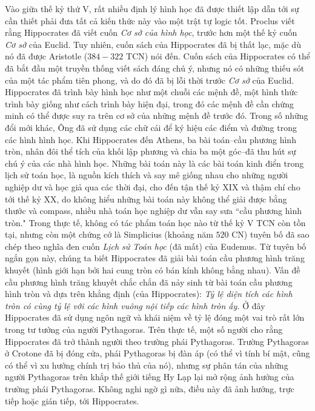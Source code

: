 \begin{multicols}{2}
	\vskip 0.1cm
	Vào giữa thế kỷ thứ V, rất nhiều định lý hình học đã được thiết lập dẫn tới sự cần thiết phải đưa tất cả kiến thức này vào một trật tự logic tốt. Proclus viết rằng Hippocrates đã viết cuốn  \textit{Cơ sở của hình học}, trước hơn một thế kỷ cuốn \textit{Cơ sở}  của Euclid. Tuy nhiên, cuốn sách của Hippocrates đã bị thất lạc, mặc dù nó đã được Aristotle ($384-322$ TCN) nói đến. Cuốn sách của Hippocrates có thể đã bắt đầu một truyền thống viết sách đáng chú ý, nhưng nó có những thiếu sót của một tác phẩm tiên phong, và do đó đã bị lỗi thời trước \textit{Cơ sở} của Euclid.
	\vskip 0.1cm
	Hippocrates đã trình bày hình học như một chuỗi các mệnh đề, một hình thức trình bày giống như cách trình bày hiện đại, trong đó các mệnh đề cần chứng minh có thể được suy ra trên cơ sở của những mệnh đề trước đó. Trong số những đổi mới khác, Ông đã sử dụng các chữ cái để ký hiệu các điểm và đường trong các hình hình học.
	\vskip 0.1cm
	Khi Hippocrates đến Athens, ba bài toán--cầu phương hình tròn, nhân đôi thể tích của khối lập phương và chia ba một góc--đã thu hút sự chú ý của các nhà hình học. Những bài toán này là các bài toán kinh điển trong lịch sử toán học, là  nguồn kích thích và say mê giống nhau cho những người nghiệp dư và học giả qua các thời đại, cho đến tận thế kỷ XIX và thậm chí cho tới thế kỷ XX, do không hiểu những bài toán này không thể giải được bằng thước và compass, nhiều nhà toán học nghiệp dư vẫn say sưa ``cầu phương hình tròn."
	\vskip 0.1cm
	Trong thực tế, không có tác phẩm toán học nào từ thế kỷ V TCN còn tồn tại, nhưng còn một chứng cớ là Simplicius (khoảng năm $520$ CN) tuyên bố đã sao chép theo nghĩa đen cuốn  \textit{Lịch sử Toán học} (đã mất) của Eudemus. Từ tuyên bố ngắn gọn này, chúng ta biết Hippocrates đã giải bài toán cầu phương hình trăng khuyết (hình giới hạn bởi hai cung tròn có bán kính không bằng nhau). Vấn đề cầu phương hình trăng khuyết chắc chắn đã nảy sinh từ bài toán cầu phương hình tròn và dựa trên khẳng định (của Hippocrates): \textit{Tỷ lệ diện tích các hình tròn có cùng tỷ lệ với các hình vuông nội tiếp các hình tròn ấy.}
	\vskip 0.1cm
	Ở đây Hippocrates đã sử dụng ngôn ngữ và khái niệm về tỷ lệ đóng một vai trò rất lớn trong tư tưởng của người Pythagoras. Trên thực tế, một số người cho rằng Hippocrates đã trở thành người theo trường phái Pythagoras. Trường Pythagoras ở Crotone đã bị đóng cửa, phái Pythagoras bị đàn áp (có thể vì tính bí mật, cũng có thể vì xu hướng chính trị bảo thủ của nó), nhưng sự phân tán của những người Pythagoras trên khắp thế giới tiếng Hy Lạp lại mở rộng ảnh hưởng của trường phái Pythagoras. Không nghi ngờ gì nữa, điều này đã ảnh hưởng, trực tiếp hoặc gián tiếp, tới Hippocrates.

\end{multicols}
